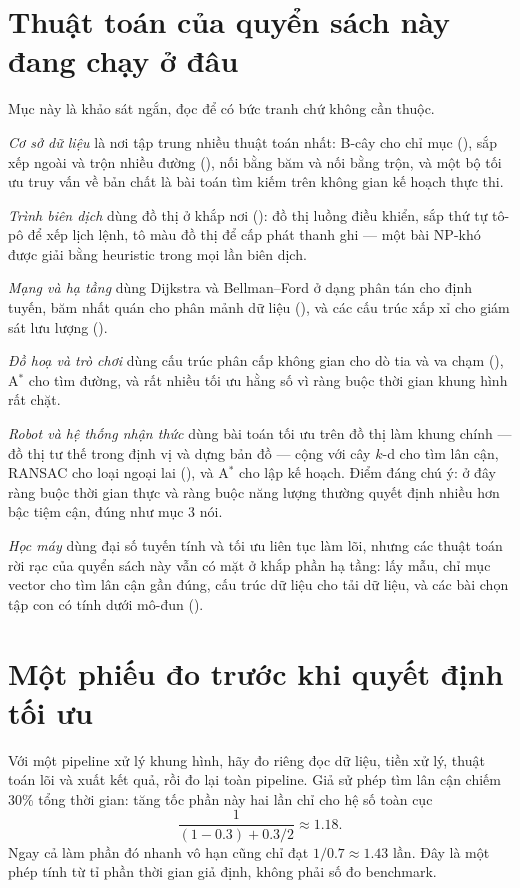 \documentclass[../../algorithm.tex]{subfiles}
\begin{document}
\section{Thuật toán của quyển sách này đang chạy ở đâu}

Mục này là khảo sát ngắn, đọc để có bức tranh chứ không cần thuộc.

\emph{Cơ sở dữ liệu} là nơi tập trung nhiều thuật toán nhất: B-cây cho chỉ mục (), sắp xếp ngoài và trộn nhiều đường (), nối bằng băm và nối bằng trộn, và một bộ tối ưu truy vấn về bản chất là bài toán tìm kiếm trên không gian kế hoạch thực thi.

\emph{Trình biên dịch} dùng đồ thị ở khắp nơi (): đồ thị luồng điều khiển, sắp thứ tự tô-pô để xếp lịch lệnh, tô màu đồ thị để cấp phát thanh ghi --- một bài NP-khó được giải bằng heuristic trong mọi lần biên dịch.

\emph{Mạng và hạ tầng} dùng Dijkstra và Bellman--Ford ở dạng phân tán cho định tuyến, băm nhất quán cho phân mảnh dữ liệu (), và các cấu trúc xấp xỉ cho giám sát lưu lượng ().

\emph{Đồ hoạ và trò chơi} dùng cấu trúc phân cấp không gian cho dò tia và va chạm (), A\(^\ast\) cho tìm đường, và rất nhiều tối ưu hằng số vì ràng buộc thời gian khung hình rất chặt.

\emph{Robot và hệ thống nhận thức} dùng bài toán tối ưu trên đồ thị làm khung chính --- đồ thị tư thế trong định vị và dựng bản đồ --- cộng với cây \(k\)-d cho tìm lân cận, RANSAC cho loại ngoại lai (), và A\(^\ast\) cho lập kế hoạch. Điểm đáng chú ý: ở đây ràng buộc thời gian thực và ràng buộc năng lượng thường quyết định nhiều hơn bậc tiệm cận, đúng như mục 3 nói.

\emph{Học máy} dùng đại số tuyến tính và tối ưu liên tục làm lõi, nhưng các thuật toán rời rạc của quyển sách này vẫn có mặt ở khắp phần hạ tầng: lấy mẫu, chỉ mục vector cho tìm lân cận gần đúng, cấu trúc dữ liệu cho tải dữ liệu, và các bài chọn tập con có tính dưới mô-đun ().


\section{Một phiếu đo trước khi quyết định tối ưu}

Với một pipeline xử lý khung hình, hãy đo riêng đọc dữ liệu, tiền xử lý, thuật toán lõi và xuất kết quả, rồi đo lại toàn pipeline.
Giả sử phép tìm lân cận chiếm 30\% tổng thời gian: tăng tốc phần này hai lần chỉ cho hệ số toàn cục
\[
\frac{1}{(1-0.3)+0.3/2}\approx1.18.
\]
Ngay cả làm phần đó nhanh vô hạn cũng chỉ đạt \(1/0.7\approx1.43\) lần.
Đây là một phép tính từ tỉ phần thời gian giả định, không phải số đo benchmark.
\end{document}
